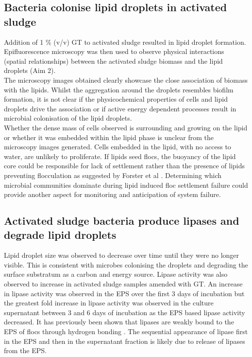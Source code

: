 \documentclass[twoside]{article}
\begin{document}
\subsection{Bacteria colonise lipid droplets in activated sludge}
Addition of 1 \% (v/v) GT to activated sludge resulted in lipid droplet formation. Epifluorescence microscopy was then used to observe physical interactions (spatial relationships) between the activated sludge biomass and the lipid droplets (Aim 2). \\

The microscopy images obtained clearly showcase the close association of biomass with the lipids. Whilst the aggregation around the droplets resembles biofilm formation, it is not clear if the physicochemical properties of cells and lipid droplets drive the association or if active energy dependent processes result in microbial colonisation of the lipid droplets. \\

Whether the dense mass of cells observed is surrounding and growing on the lipid or whether it was embedded within the lipid phase is unclear from the microscopy images generated. Cells embedded in the lipid, with no access to water, are unlikely to proliferate. If lipids seed flocs, the buoyancy of the lipid core could be responsible for lack of settlement rather than the presence of lipids preventing flocculation as suggested by Forster et al \cite{Forster_92}. Determining which microbial communities dominate during lipid induced floc settlement failure could provide another aspect for monitoring and anticipation of system failure.

\subsection{Activated sludge bacteria produce lipases and degrade lipid droplets}

Lipid droplet size was observed to decrease over time until they were no longer visible. This is consistent with microbes colonising the droplets and degrading the surface substratum as a carbon and energy source. Lipase activity was also observed to increase in activated sludge samples amended with GT. An increase in lipase activity was observed in the EPS over the first 3 days of incubation but the greatest fold increase in lipase activity was observed in the culture supernatant between 3 and 6 days of incubation as the EPS based lipase activity decreased. It has previously been shown that lipases are weakly bound to the EPS of flocs through hydrogen bonding \cite{mayer1999role,wicker1987}. The sequential appearance of lipase first in the EPS and then in the supernatant fraction is likely due to release of lipases from the EPS.\\
\end{document}
